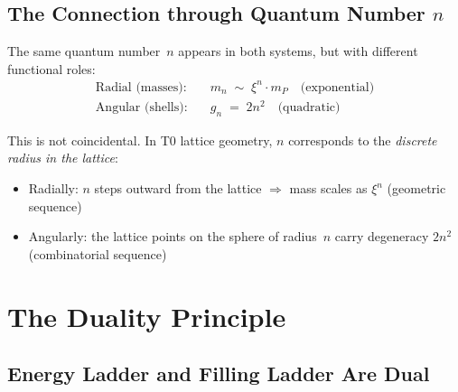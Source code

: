 \begin{table}[htbp]
\centering
\caption{Shell structure and the periodic table}
\label{tab:shells}
\end{table}

\subsection{The Connection through Quantum Number \texorpdfstring{$n$}{n}}
\label{subsec:connection-n}

The same quantum number~$n$ appears in both systems, but with different
functional roles:
\begin{align}
  \text{Radial (masses):}  &\quad m_n \;\sim\; \xi^{n} \cdot m_P
    \quad\text{(exponential)} \\
  \text{Angular (shells):} &\quad g_n \;=\; 2n^2
    \quad\text{(quadratic)}
\end{align}

This is not coincidental. In T0 lattice geometry, $n$ corresponds to the
\emph{discrete radius in the lattice}:
\begin{itemize}
  \item Radially: $n$ steps outward from the lattice $\Rightarrow$
    mass scales as $\xi^{n}$ (geometric sequence)
  \item Angularly: the lattice points on the sphere of radius~$n$ carry
    degeneracy $2n^2$ (combinatorial sequence)
\end{itemize}

\section{The Duality Principle}
\label{sec:duality}

\subsection{Energy Ladder and Filling Ladder Are Dual}
\label{subsec:dual}

